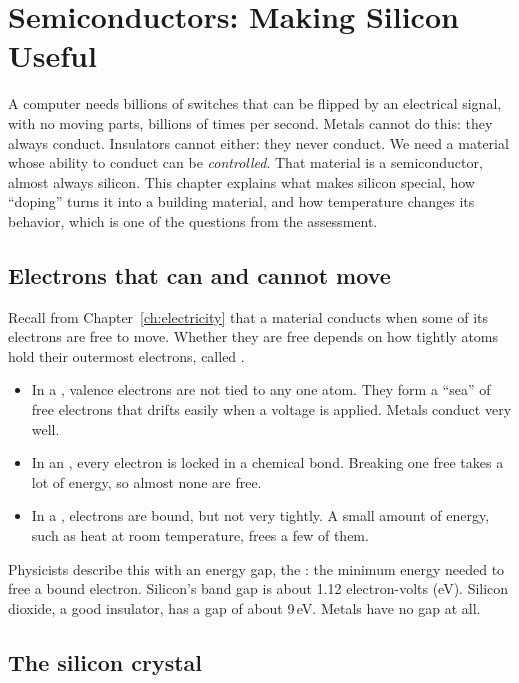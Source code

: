 \chapter{Semiconductors: Making Silicon Useful}
\label{ch:semis}

A computer needs billions of switches that can be flipped by an electrical signal, with no moving parts, billions of times per second. Metals cannot do this: they always conduct. Insulators cannot either: they never conduct. We need a material whose ability to conduct can be \emph{controlled}. That material is a semiconductor, almost always silicon. This chapter explains what makes silicon special, how ``doping'' turns it into a building material, and how temperature changes its behavior, which is one of the questions from the assessment.

\section{Electrons that can and cannot move}

Recall from Chapter~\ref{ch:electricity} that a material conducts when some of its electrons are free to move. Whether they are free depends on how tightly atoms hold their outermost electrons, called .

\begin{itemize}
  \item In a , valence electrons are not tied to any one atom. They form a ``sea'' of free electrons that drifts easily when a voltage is applied. Metals conduct very well.
  \item In an , every electron is locked in a chemical bond. Breaking one free takes a lot of energy, so almost none are free.
  \item In a , electrons are bound, but not very tightly. A small amount of energy, such as heat at room temperature, frees a few of them.
\end{itemize}

Physicists describe this with an energy gap, the : the minimum energy needed to free a bound electron. Silicon's band gap is about 1.12 electron-volts (eV). Silicon dioxide, a good insulator, has a gap of about 9\,eV. Metals have no gap at all.

\section{The silicon crystal}

